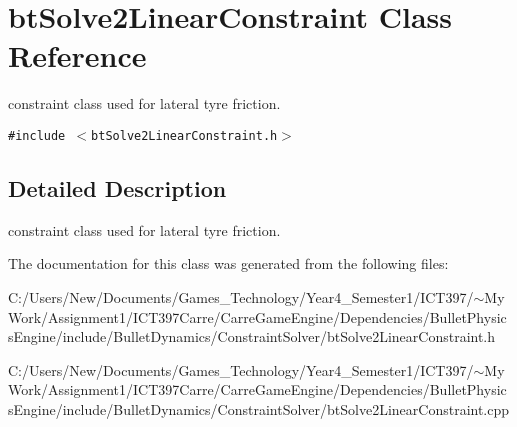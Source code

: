 \hypertarget{classbt_solve2_linear_constraint}{
\section{btSolve2LinearConstraint Class Reference}
\label{classbt_solve2_linear_constraint}
}
constraint class used for lateral tyre friction.  


{\tt \#include $<$btSolve2LinearConstraint.h$>$}



\subsection{Detailed Description}
constraint class used for lateral tyre friction. 

The documentation for this class was generated from the following files:\begin{CompactItemize}
\item 
C:/Users/New/Documents/Games\_\-Technology/Year4\_\-Semester1/ICT397/$\sim$My Work/Assignment1/ICT397Carre/CarreGameEngine/Dependencies/BulletPhysicsEngine/include/BulletDynamics/ConstraintSolver/btSolve2LinearConstraint.h\item 
C:/Users/New/Documents/Games\_\-Technology/Year4\_\-Semester1/ICT397/$\sim$My Work/Assignment1/ICT397Carre/CarreGameEngine/Dependencies/BulletPhysicsEngine/include/BulletDynamics/ConstraintSolver/btSolve2LinearConstraint.cpp\end{CompactItemize}
